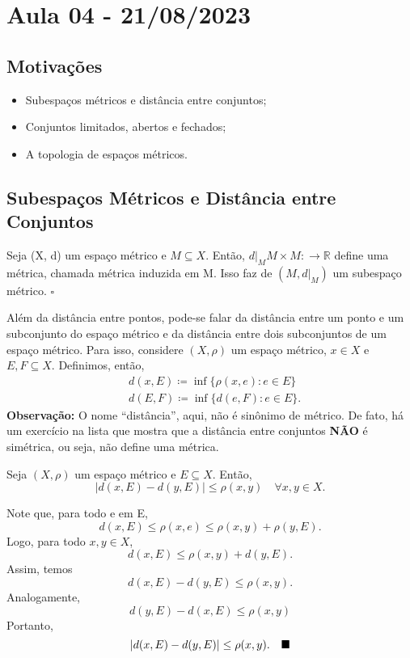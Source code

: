 \documentclass[MetricSpaces/metric_notes.tex]{subfiles}
\begin{document}
\section{Aula 04 - 21/08/2023}
\subsection{Motivações}
\begin{itemize}
	\item Subespaços métricos e distância entre conjuntos;
	\item Conjuntos limitados, abertos e fechados;
	\item A topologia de espaços métricos.
\end{itemize}
\subsection{Subespaços Métricos e Distância entre Conjuntos}
\begin{def*}
	Seja (X, d) um espaço métrico e \(M\subseteq{X}.\) Então, \(d|_{M}M\times M:\rightarrow \mathbb{R}\)
	define uma métrica, chamada métrica induzida em M. Isso faz de \((M, d|_M)\) um subespaço métrico. \(\square\)
\end{def*}
Além da distância entre pontos, pode-se falar da distância entre um ponto e um subconjunto do espaço métrico
e da distância entre dois subconjuntos de um espaço métrico. Para isso, considere \((X, \rho )\) um espaço métrico,
\(x\in X\) e \(E, F\subseteq{X}.\) Definimos, então,
\begin{align*}
	 & d(x, E)\coloneqq \inf\{\rho (x, e): e\in E\} \\
	 & d(E, F)\coloneqq \inf\{d(e, F): e\in E\}.
\end{align*}
\textbf{Observação:} O nome ``distância'', aqui, não é sinônimo de métrico. De fato, há um exercício na lista que mostra que a distância entre conjuntos
\textbf{NÃO} é simétrica, ou seja, não define uma métrica.
\begin{prop*}
	Seja \((X, \rho )\) um espaço métrico e \(E\subseteq{X}.\) Então,
	\[
		|d(x, E) - d(y, E)|\leq \rho (x, y) \quad \forall x, y\in X.
	\]
\end{prop*}
\begin{proof*}
	Note que, para todo e em E,
	\[
		d(x, E)\leq \rho (x, e)\leq \rho (x, y) + \rho (y, E).
	\]
	Logo, para todo \(x, y\in X\),
	\[
		d(x, E)\leq \rho (x, y) + d(y, E).
	\]
	Assim, temos
	\[
		d(x, E) - d(y, E)\leq \rho (x, y).
	\]
	Analogamente,
	\[
		d(y, E) - d(x, E)\leq \rho (x, y)
	\]
	Portanto,
	\[
		|d(x, E) - d(y, E)|\leq \rho (x, y).\quad\text{$\blacksquare$}
	\]
\end{proof*}
\end{document}
